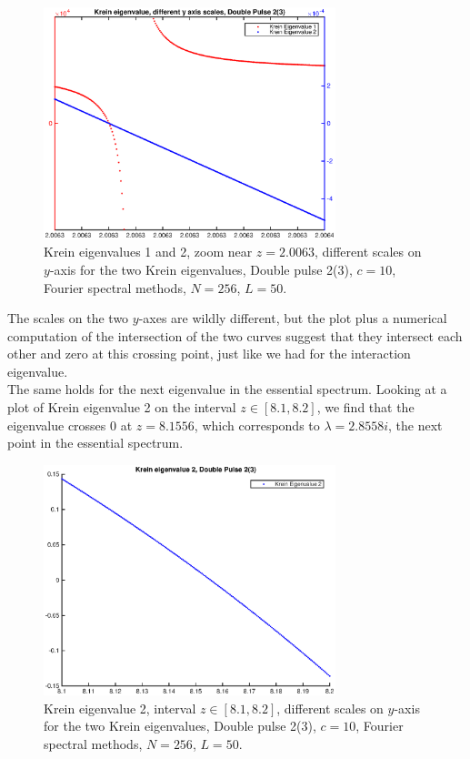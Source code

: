 \documentclass[12pt]{article}
\begin{document}
\begin{figure}[H]
	\includegraphics[width=8.5cm]{dp2kreineigsingnear2diffy.eps}
	\caption{Krein eigenvalues 1 and 2, zoom near $z = 2.0063$, different scales on $y$-axis for the two Krein eigenvalues, Double pulse 2(3), $c = 10$, Fourier spectral methods, $N = 256$, $L = 50$. }
\end{figure}

The scales on the two $y$-axes are wildly different, but the plot plus a numerical computation of the intersection of the two curves suggest that they intersect each other and zero at this crossing point, just like we had for the interaction eigenvalue. \\

The same holds for the next eigenvalue in the essential spectrum. Looking at a plot of Krein eigenvalue 2 on the interval $z \in [8.1, 8.2]$, we find that the eigenvalue crosses 0 at $z = 8.1556$, which corresponds to $\lambda = 2.8558i$, the next point in the essential spectrum.

\begin{figure}[H]
	\includegraphics[width=8.5cm]{dp2kreineigsingnear8.eps}
	\caption{Krein eigenvalue 2, interval $z \in [8.1, 8.2]$, different scales on $y$-axis for the two Krein eigenvalues, Double pulse 2(3), $c = 10$, Fourier spectral methods, $N = 256$, $L = 50$. }
\end{figure}
\end{document}
